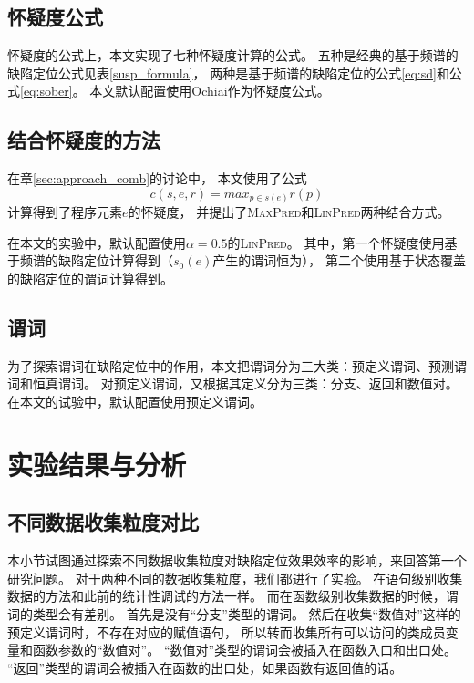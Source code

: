 \subsection{怀疑度公式}
\label{sec:exp_all_formula}

怀疑度的公式上，本文实现了七种怀疑度计算的公式。
五种是经典的基于频谱的缺陷定位公式见表\ref{susp_formula}，
两种是基于频谱的缺陷定位的公式\ref{eq:sd}和公式\ref{eq:sober}。
本文默认配置使用Ochiai作为怀疑度公式。

\subsection{结合怀疑度的方法}

在章\ref{sec:approach_comb}的讨论中，
本文使用了公式
$$
c(s,e,r) = max_{p \in s(e)}r(p)
$$
计算得到了程序元素$e$的怀疑度，
并提出了\textsc{MaxPred}和\textsc{LinPred}两种结合方式。

在本文的实验中，默认配置使用$\alpha = 0.5$的\textsc{LinPred}。
其中，第一个怀疑度使用基于频谱的缺陷定位计算得到（$s_0(e)$产生的谓词恒为），
第二个使用基于状态覆盖的缺陷定位的谓词计算得到。

\subsection{谓词}

为了探索谓词在缺陷定位中的作用，本文把谓词分为三大类：预定义谓词、预测谓词和恒真谓词。
对预定义谓词，又根据其定义分为三类：分支、返回和数值对。
在本文的试验中，默认配置使用预定义谓词。

\section{实验结果与分析}

\subsection{不同数据收集粒度对比}

本小节试图通过探索不同数据收集粒度对缺陷定位效果效率的影响，来回答第一个研究问题。
对于两种不同的数据收集粒度，我们都进行了实验。
在语句级别收集数据的方法和此前的统计性调试的方法一样。
而在函数级别收集数据的时候，谓词的类型会有差别。
首先是没有“分支”类型的谓词。
然后在收集“数值对”这样的预定义谓词时，不存在对应的赋值语句，
所以转而收集所有可以访问的类成员变量和函数参数的“数值对”。
“数值对”类型的谓词会被插入在函数入口和出口处。
“返回”类型的谓词会被插入在函数的出口处，如果函数有返回值的话。

